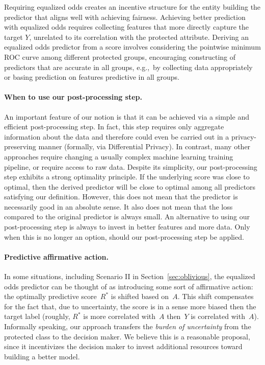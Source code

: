 Requiring equalized odds creates an incentive structure for the entity
building the predictor that aligns well with achieving fairness.
Achieving better prediction with equalized odds requires collecting
features that more directly capture the target $Y$, unrelated to its
correlation with the protected attribute. Deriving an equalized
odds predictor from a score involves considering the pointwise minimum
ROC curve among different protected groups, encouraging constructing
of predictors that are accurate in all groups, e.g.,~by collecting data
appropriately or basing prediction on features predictive in all
groups.

\paragraph{When to use our post-processing step.}
An important feature of our notion is that it can be achieved via a simple and
efficient post-processing step. In fact, this step requires only aggregate
information about the data and therefore could even be carried out in a
privacy-preserving manner (formally, via Differential Privacy). In contrast,
many other approaches require changing a usually complex machine learning
training pipeline, or require access to raw data. Despite its simplicity, our
post-processing step exhibits a strong optimality principle. If the underlying
score was close to optimal, then the derived predictor will be close to optimal
among all predictors satisfying our definition. However, this does not mean that
the predictor is necessarily good in an absolute sense. It also does not mean
that the loss compared to the original predictor is always small.  An
alternative to using our post-processing step is always to invest in better
features and more data. Only when this is no longer an option, should our
post-processing step be applied.

\paragraph{Predictive affirmative action.}
In some situations, including Scenario II in
Section~\ref{sec:oblivious}, the equalized odds predictor can be thought of as
introducing some sort of affirmative action: the optimally predictive
score~$R^*$ is shifted based on~$A$. This shift compensates for the fact that,
due to uncertainty, the score is in a sense more biased then the target label
(roughly, $R^*$ is more correlated with~$A$ then~$Y$ is correlated with~$A$).
Informally speaking, our approach transfers the \emph{burden of uncertainty}
from the protected class to the decision maker. We believe this is a reasonable
proposal, since it incentivizes the decision maker to invest additional
resources toward building a better model.
